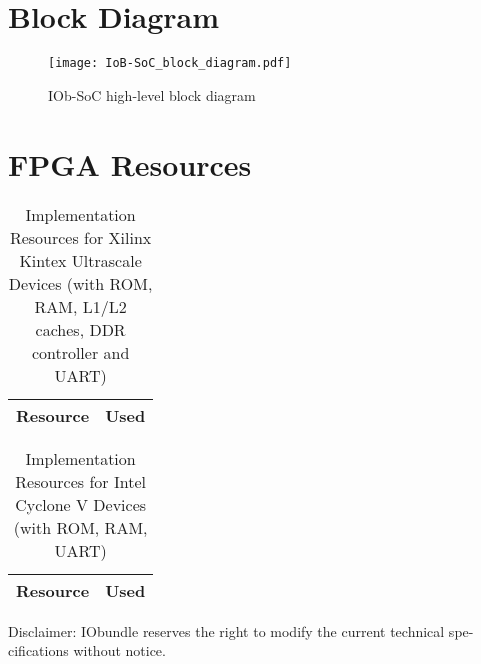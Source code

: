 \documentclass[twocolumn]{../../submodules/UART/submodules/TEX/document/pb/pb}
\begin{document}
\section*{\textcolor[rgb]{0,0,0}{Block Diagram}}

\begin{figure}[H]
  \begin{center}
    \texttt{[image: IoB-SoC\_block\_diagram.pdf]}
    \caption{IOb-SoC high-level block diagram}
    \label{fig:IOb-SoC}
  \end{center}
\end{figure}




\section*{FPGA Resources}

\ifnum{}
\begin{table}[H]
  \begin{center}
    \begin{tabular}{|l|r|}
      \hline
%      
      \rowcolor{iob-green}
      \textbf{Resource}  & \textbf{Used} \\
      \hline
      \hline

       

    \end{tabular}
    \caption{Implementation Resources for Xilinx Kintex Ultrascale Devices (with ROM, RAM, L1/L2 caches, DDR controller and UART)}
    \label{tab:res-xil}
  \end{center}
\end{table}
\fi


\ifnum{}
\begin{table}[H]
  \begin{center}
    \begin{tabular}{|l|r|}
      \hline

      \rowcolor{iob-green}
      \textbf{Resource}  & \textbf{Used} \\
      \hline
      \hline

       
        
    \end{tabular}
    \caption{Implementation Resources for Intel Cyclone V Devices (with ROM, RAM, UART)}
    \label{tab:res-alt}
  \end{center}
\end{table}
\fi

\vspace*{0.5cm}
\noindent
\begin{scriptsize}
Disclaimer: IObundle reserves the right to modify the current
technical spe-cifications without notice.
\end{scriptsize}
\newpage
\end{document}
